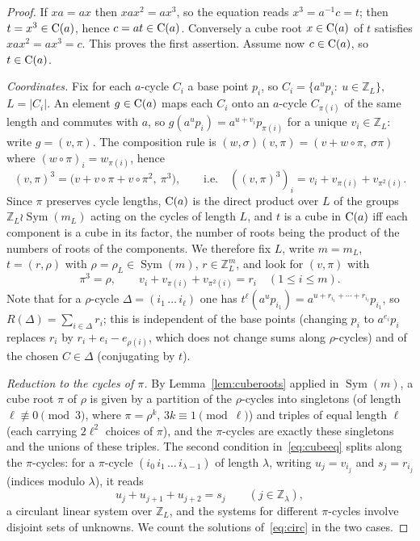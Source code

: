 \documentclass[preprint,12pt]{elsarticle}
\theoremstyle{definition}\newtheorem{defi}[thm]{Definition}\newtheorem{prob}[thm]{Problem}\newtheorem{obs}[thm]{Observation}
\theoremstyle{remark}\newtheorem{rem}[thm]{Remark}
\newcommand{\ZZ}{\mathbb Z}\newcommand{\Sym}{\operatorname{Sym}}\newcommand{\Alt}{\operatorname{Alt}}
\begin{document}
\begin{proof}
If $xa=ax$ then $xax^{2}=ax^{3}$, so the equation reads $x^{3}=a^{-1}c=t$; then $t=x^{3}\in\operatorname{C}(a)$, hence $c=at\in\operatorname{C}(a)$. Conversely a cube root $x\in\operatorname{C}(a)$ of $t$ satisfies $xax^{2}=ax^{3}=c$. This proves the first assertion. Assume now $c\in\operatorname{C}(a)$, so $t\in\operatorname{C}(a)$.

\emph{Coordinates.} Fix for each $a$-cycle $C_i$ a base point $p_i$, so $C_i=\{a^{u}p_i:\ u\in\ZZ_{L}\}$, $L=|C_i|$. An element $g\in\operatorname{C}(a)$ maps each $C_i$ onto an $a$-cycle $C_{\pi(i)}$ of the same length and commutes with $a$, so $g(a^{u}p_i)=a^{u+v_i}p_{\pi(i)}$ for a unique $v_i\in\ZZ_L$: write $g=(v,\pi)$. The composition rule is $(w,\sigma)(v,\pi)=(v+w\circ\pi,\ \sigma\pi)$ where $(w\circ\pi)_i=w_{\pi(i)}$, hence
\[
(v,\pi)^{3}=\bigl(v+v\circ\pi+v\circ\pi^{2},\ \pi^{3}\bigr),\qquad\text{i.e.}\quad ((v,\pi)^{3})_i=v_i+v_{\pi(i)}+v_{\pi^{2}(i)} .
\]
Since $\pi$ preserves cycle lengths, $\operatorname{C}(a)$ is the direct product over $L$ of the groups $\ZZ_L\wr\Sym(m_L)$ acting on the cycles of length $L$, and $t$ is a cube in $\operatorname{C}(a)$ iff each component is a cube in its factor, the number of roots being the product of the numbers of roots of the components. We therefore fix $L$, write $m=m_L$, $t=(r,\rho)$ with $\rho=\rho_L\in\Sym(m)$, $r\in\ZZ_L^{m}$, and look for $(v,\pi)$ with
\begin{equation}\label{eq:cubeeq}
\pi^{3}=\rho,\qquad v_i+v_{\pi(i)}+v_{\pi^{2}(i)}=r_i\quad(1\le i\le m).
\end{equation}
Note that for a $\rho$-cycle $\Delta=(i_1\,\ldots\,i_\ell)$ one has $t^{\ell}(a^{u}p_{i_1})=a^{u+r_{i_1}+\cdots+r_{i_\ell}}p_{i_1}$, so $R(\Delta)=\sum_{i\in\Delta}r_i$; this is independent of the base points (changing $p_i$ to $a^{e_i}p_i$ replaces $r_i$ by $r_i+e_i-e_{\rho(i)}$, which does not change sums along $\rho$-cycles) and of the chosen $C\in\Delta$ (conjugating by $t$).

\emph{Reduction to the cycles of $\pi$.} By Lemma~\ref{lem:cuberoots} applied in $\Sym(m)$, a cube root $\pi$ of $\rho$ is given by a partition of the $\rho$-cycles into singletons (of length $\ell\not\equiv0\pmod3$, where $\pi=\rho^{k}$, $3k\equiv1\pmod\ell$) and triples of equal length $\ell$ (each carrying $2\ell^{2}$ choices of $\pi$), and the $\pi$-cycles are exactly these singletons and the unions of these triples. The second condition in~\eqref{eq:cubeeq} splits along the $\pi$-cycles: for a $\pi$-cycle $(i_0\,i_1\,\ldots\,i_{\lambda-1})$ of length $\lambda$, writing $u_j=v_{i_j}$ and $s_j=r_{i_j}$ (indices modulo $\lambda$), it reads
\begin{equation}\label{eq:circ}
u_j+u_{j+1}+u_{j+2}=s_j\qquad (j\in\ZZ_\lambda),
\end{equation}
a circulant linear system over $\ZZ_L$, and the systems for different $\pi$-cycles involve disjoint sets of unknowns. We count the solutions of~\eqref{eq:circ} in the two cases.


\end{proof}
\end{document}
